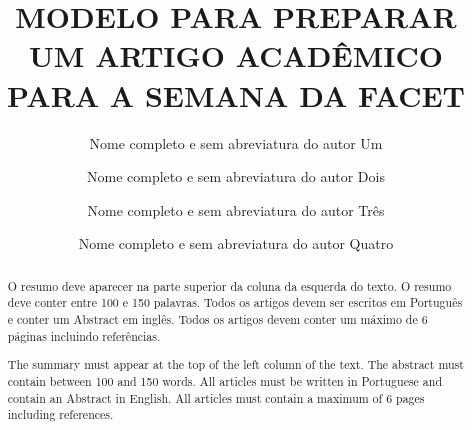\documentclass[12pt,a4paper,oneside,linenumbers=off,latinmodern=off,timesnews=off,spanish,english,portuges]{rctart-class/rctart}
\title{MODELO PARA PREPARAR UM ARTIGO ACADÊMICO PARA A SEMANA DA FACET}
\author[1,$\dagger$]{Nome completo e sem abreviatura do autor Um}
\author[2]{Nome completo e sem abreviatura do autor Dois}
\author[3,$\dagger$]{Nome completo e sem abreviatura do autor Três}
\author[4]{Nome completo e sem abreviatura do autor Quatro}
\affil[1]{Afiliação, cidade – \url{email}}
\affil[2]{Afiliação, cidade – \url{email}}
\affil[3]{Afiliação, cidade – \url{email}}
\affil[4]{Afiliação, cidade – \url{email}}
\affil[$\dagger$]{Estes autores contribuíram igualmente para este trabalho}
\begin{document}
\twocolumn[
    \maketitle
    \thispagestyle{firststyle}
    \linenumbers 



]
\begin{abstract}
   O resumo deve aparecer na parte superior da coluna da esquerda do texto.  O resumo deve conter entre 100 e 150 palavras. Todos os artigos devem ser escritos em Português e conter um Abstract em inglês. Todos os artigos devem conter um máximo de 6 páginas incluindo referências. 
\end{abstract}

\begin{otherlanguage}{english}
\begin{abstract}
  The summary must appear at the top of the left column of the text.  The abstract must contain between 100 and 150 words. All articles must be written in Portuguese and contain an Abstract in English. All articles must contain a maximum of 6 pages including references.
\end{abstract}
\end{otherlanguage}
% 
\end{document}
